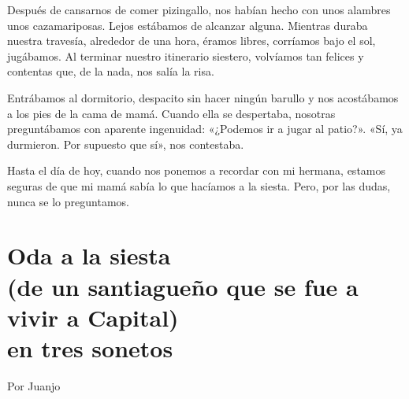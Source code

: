 \documentclass[11pt,twoside,openright,a5paper]{book}
\begin{document}
Después de cansarnos de comer pizingallo, nos habían hecho con  unos alambres unos cazamariposas. Lejos estábamos de alcanzar alguna. Mientras duraba nuestra travesía, alrededor de una hora, éramos libres, corríamos bajo el sol, jugábamos. Al terminar nuestro itinerario siestero, volvíamos tan felices y contentas que, de la nada, nos salía la risa.

Entrábamos al dormitorio, despacito sin hacer ningún barullo y nos acostábamos a los pies de la cama de mamá. Cuando ella se despertaba, nosotras preguntábamos con aparente ingenuidad: «¿Podemos ir a jugar al patio?». «Sí, ya durmieron. Por supuesto que sí», nos contestaba.

Hasta el día de hoy, cuando nos ponemos a recordar con mi hermana, estamos seguras de que mi mamá sabía lo que hacíamos a la siesta. Pero, por las dudas, nunca se lo preguntamos.

\section*{Oda a la siesta\\(de un santiagueño que se fue a vivir a Capital)\\
 en tres sonetos}

\begin{flushright}Por Juanjo\end{flushright}
\end{document}
